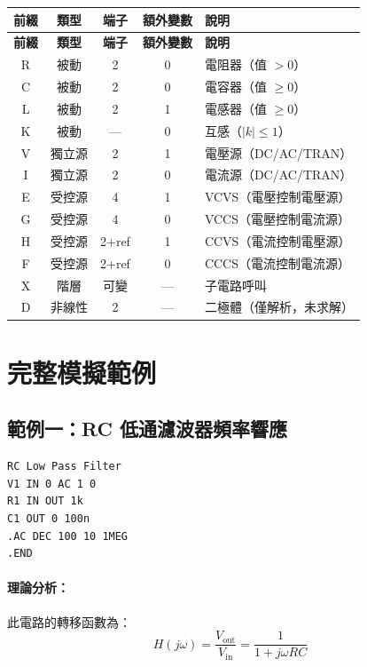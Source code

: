 \documentclass[12pt,a4paper]{article}
\begin{document}
\begin{longtable}{ccccl}
\toprule
\textbf{前綴} & \textbf{類型} & \textbf{端子} & \textbf{額外變數} & \textbf{說明} \\
\midrule
\endfirsthead
\toprule
\textbf{前綴} & \textbf{類型} & \textbf{端子} & \textbf{額外變數} & \textbf{說明} \\
\midrule
\endhead
R & 被動 & 2 & 0 & 電阻器（值 $> 0$）\\
C & 被動 & 2 & 0 & 電容器（值 $\geq 0$）\\
L & 被動 & 2 & 1 & 電感器（值 $\geq 0$）\\
K & 被動 & --- & 0 & 互感（$|k| \leq 1$）\\
V & 獨立源 & 2 & 1 & 電壓源（DC/AC/TRAN）\\
I & 獨立源 & 2 & 0 & 電流源（DC/AC/TRAN）\\
E & 受控源 & 4 & 1 & VCVS（電壓控制電壓源）\\
G & 受控源 & 4 & 0 & VCCS（電壓控制電流源）\\
H & 受控源 & 2+ref & 1 & CCVS（電流控制電壓源）\\
F & 受控源 & 2+ref & 0 & CCCS（電流控制電流源）\\
X & 階層 & 可變 & --- & 子電路呼叫 \\
D & 非線性 & 2 & --- & 二極體（僅解析，未求解）\\
\bottomrule
\end{longtable}


\section{完整模擬範例}

\subsection{範例一：RC 低通濾波器頻率響應}

\begin{lstlisting}[language=SPICE,caption={RC 低通濾波器}]
RC Low Pass Filter
V1 IN 0 AC 1 0
R1 IN OUT 1k
C1 OUT 0 100n
.AC DEC 100 10 1MEG
.END
\end{lstlisting}

\paragraph{理論分析：}
此電路的轉移函數為：
\begin{equation}
H(j\omega) = \frac{V_{\text{out}}}{V_{\text{in}}} = \frac{1}{1 + j\omega RC}
\end{equation}
\end{document}
